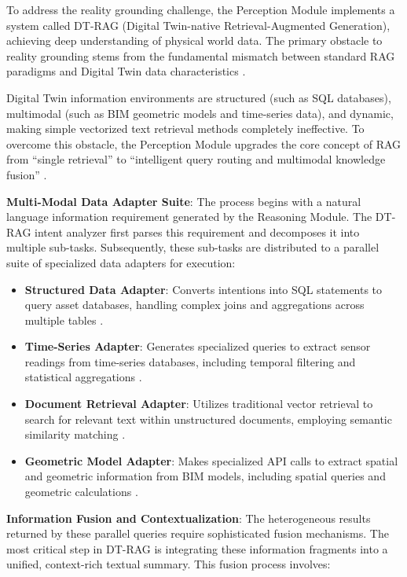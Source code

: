 To address the reality grounding challenge, the Perception Module implements a system called DT-RAG (Digital Twin-native Retrieval-Augmented Generation), achieving deep understanding of physical world data. The primary obstacle to reality grounding stems from the fundamental mismatch between standard RAG paradigms and Digital Twin data characteristics \cite{lewis2020retrieval}.

Digital Twin information environments are structured (such as SQL databases), multimodal (such as BIM geometric models and time-series data), and dynamic, making simple vectorized text retrieval methods completely ineffective. To overcome this obstacle, the Perception Module upgrades the core concept of RAG from ``single retrieval'' to ``intelligent query routing and multimodal knowledge fusion'' \cite{gao2023retrieval}.

\textbf{Multi-Modal Data Adapter Suite}: The process begins with a natural language information requirement generated by the Reasoning Module. The DT-RAG intent analyzer first parses this requirement and decomposes it into multiple sub-tasks. Subsequently, these sub-tasks are distributed to a parallel suite of specialized data adapters for execution:

\begin{itemize}
\item \textbf{Structured Data Adapter}: Converts intentions into SQL statements to query asset databases, handling complex joins and aggregations across multiple tables \cite{scholak2021duorat}.
\item \textbf{Time-Series Adapter}: Generates specialized queries to extract sensor readings from time-series databases, including temporal filtering and statistical aggregations \cite{yue2022ts2vec}.
\item \textbf{Document Retrieval Adapter}: Utilizes traditional vector retrieval to search for relevant text within unstructured documents, employing semantic similarity matching \cite{karpukhin2020dense}.
\item \textbf{Geometric Model Adapter}: Makes specialized API calls to extract spatial and geometric information from BIM models, including spatial queries and geometric calculations \cite{boje2020towards}.
\end{itemize}

\textbf{Information Fusion and Contextualization}: The heterogeneous results returned by these parallel queries require sophisticated fusion mechanisms. The most critical step in DT-RAG is integrating these information fragments into a unified, context-rich textual summary. This fusion process involves:

